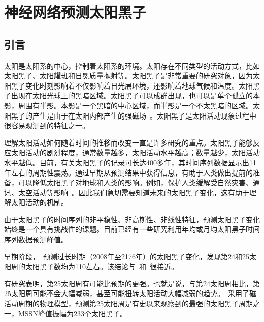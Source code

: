 \chapter{神经网络预测太阳黑子}\label{chap:ann_sunspot}

\section{引言}
太阳是太阳系的中心，控制着太阳系的环境。太阳存在不同类型的活动方式，比如太阳黑子、太阳耀斑和日冕质量抛射等。太阳黑子是非常重要的研究对象，因为太阳黑子变化时刻影响着不仅影响着日光层环境，还影响着地球气候和温度。太阳黑子出现在太阳光球上的黑暗区域。太阳黑子可以成群出现，也可以是单个孤立的本影，周围有半影。本影是一个黑暗的中心区域，而半影是一个不太黑暗的区域。太阳黑子的产生是由于在太阳内部产生的强磁场~\citep{noyes2013sun}。太阳黑子是太阳活动现象过程中很容易观测到的特征之一。

理解太阳活动如何随着时间的推移而改变一直是许多研究的重点。太阳黑子能够反应太阳活动的剧烈程度，通常数量越多，太阳活动水平越高；数量越少，太阳活动水平越低。目前，有关太阳黑子的记录可长达400多年，其时间序列数据显示出11年左右的周期性震荡。通过早期从预测结果中获得信息，有助于人类做出提前的准备，可以降低太阳黑子对地球和人类的影响。例如，保护人类缓解受自然灾害、通讯、太空活动等影响~\citet{jie2012prediction}。因此我们急切需要知道未来的太阳黑子变化，这有助于理解太阳活动的机制。

由于太阳黑子的时间序列的非平稳性、非高斯性、非线性特征，预测太阳黑子变化始终是一个具有挑战性的课题。目前已经有一些研究利用年均或月均太阳黑子时间序列数据预测峰值。

早期阶段，~\citet{hiremath2008prediction}预测过长时期（2008年至2176年）的太阳黑子变化，发现第24和25太阳周的太阳黑子数均为110左右。该结论与~\citet{podladchikova2017sunspot}和~\citet{singh2019prediction}很接近。

有研究表明，第25太阳周有可能比预期的更强。也就是说，与第24太阳周相比，第25太阳周可能不会大幅减弱，甚至可能扭转太阳活动大幅减弱的趋势。~\citet{mcintosh2020overlapping}采用了磁活动周期的物理模型，预测第25太阳周是有史以来观察到的最强的太阳黑子周期之一，MSSN峰值振幅为233个太阳黑子。

